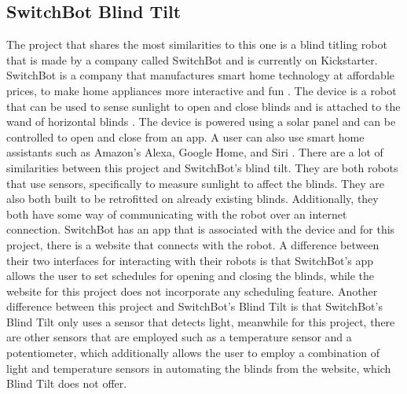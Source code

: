 \documentclass[10pt,twocolumn]{article}
\begin{document}
\subsection{SwitchBot Blind Tilt}
The project that shares the most similarities to this one is a blind titling robot that is made by a company called SwitchBot and is currently on Kickstarter. SwitchBot is a company that manufactures smart home technology at affordable prices, to make home appliances more interactive and fun \cite{SwitchBot2022}. The device is a robot that can be used to sense sunlight to open and close blinds and is attached to the wand of horizontal blinds \cite{WonderTechLab2022SwitchBot}. The device is powered using a solar panel and can be controlled to open and close from an app. A user can also use smart home assistants such as Amazon’s Alexa, Google Home, and Siri \cite{WonderTechLab2022SwitchBot}. There are a lot of similarities between this project and SwitchBot’s blind tilt. They are both robots that use sensors, specifically to measure sunlight to affect the blinds. They are also both built to be retrofitted on already existing blinds. Additionally, they both have some way of communicating with the robot over an internet connection. SwitchBot has an app that is associated with the device and for this project, there is a website that connects with the robot. A difference between their two interfaces for interacting with their robots is that SwitchBot’s app allows the user to set schedules for opening and closing the blinds, while the website for this project does not incorporate any scheduling feature. Another difference between this project and SwitchBot’s Blind Tilt is that SwitchBot’s Blind Tilt only uses a sensor that detects light, meanwhile for this project, there are other sensors that are employed such as a temperature sensor and a potentiometer, which additionally allows the user to employ a combination of light and temperature sensors in automating the blinds from the website, which Blind Tilt does not offer. 
\end{document}
